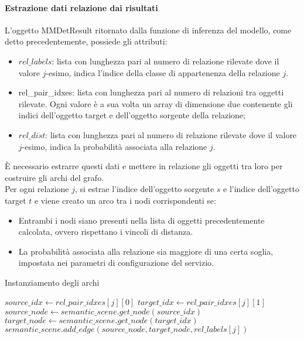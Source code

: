 \paragraph{Estrazione dati relazione dai risultati}
L'oggetto MMDetResult ritornato dalla funzione di inferenza del modello, come detto precedentemente, possiede gli attributi:
\begin{itemize}
	\item $rel\_labels$: lista con lunghezza pari al numero di relazione rilevate dove il valore $j$-esimo, indica l'indice della classe di appartenenza della relazione $j$.
	\item rel\_pair\_idxes: lista con lunghezza pari al numero di relazioni tra oggetti rilevate. Ogni valore è a sua volta un array di dimensione due contenente gli indici dell'oggetto target e dell'oggetto sorgente della relazione;
	\item $rel\_dist$: lista con lunghezza pari al numero di relazione rilevate dove il valore $j$-esimo, indica la probabilità associata alla relazione $j$.
\end{itemize}
È necessario estrarre questi dati e mettere in relazione gli oggetti tra loro per costruire gli archi del grafo.\\
Per ogni relazione $j$, si estrae l'indice dell'oggetto sorgente $s$ e l'indice dell'oggetto target $t$ e viene creato un arco tra i nodi corrispondenti se:
\begin{itemize}
	\item Entrambi i nodi siano presenti nella lista di oggetti precedentemente calcolata, ovvero rispettano i vincoli di distanza.
	\item La probabilità associata alla relazione sia maggiore di una certa soglia, impostata nei parametri di configurazione del servizio.
\end{itemize}

\begin{algorithm}
	\caption{Instanziamento degli archi}
	\begin{algorithmic}[1]
		\State $source\_idx \gets rel\_pair\_idxes[j][0]$
		\State $target\_idx \gets rel\_pair\_idxes[j][1]$
		\State $source\_node \gets semantic\_scene.get\_node(source\_idx)$
		\State $target\_node \gets semantic\_scene.get\_node(target\_idx)$
		\State $semantic\_scene.add\_edge(source\_node, target\_node, rel\_labels[j])$
		\EndIf
		\EndIf
		\EndFor
	\end{algorithmic}
\end{algorithm}

